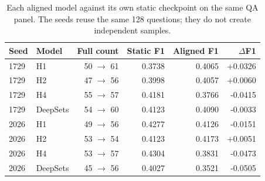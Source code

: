 \begin{table}[t]
\centering\small
\caption{Each aligned model against its own static checkpoint on the same QA panel. The seeds reuse the same 128 questions; they do not create independent samples.}\label{tab:paired}
\begin{tabular}{llrrrr}\toprule
Seed & Model & Full count & Static F1 & Aligned F1 & $\Delta$F1 \\
\midrule
1729 & H1 & 50 $\to$ 61 & 0.3738 & 0.4065 & +0.0326 \\
1729 & H2 & 47 $\to$ 56 & 0.3998 & 0.4057 & +0.0060 \\
1729 & H4 & 55 $\to$ 57 & 0.4181 & 0.3766 & -0.0415 \\
1729 & DeepSets & 54 $\to$ 60 & 0.4123 & 0.4090 & -0.0033 \\
2026 & H1 & 49 $\to$ 56 & 0.4277 & 0.4126 & -0.0151 \\
2026 & H2 & 53 $\to$ 54 & 0.4123 & 0.4173 & +0.0051 \\
2026 & H4 & 53 $\to$ 57 & 0.4304 & 0.3831 & -0.0473 \\
2026 & DeepSets & 45 $\to$ 56 & 0.4027 & 0.3521 & -0.0505 \\
\bottomrule\end{tabular}
\end{table}
